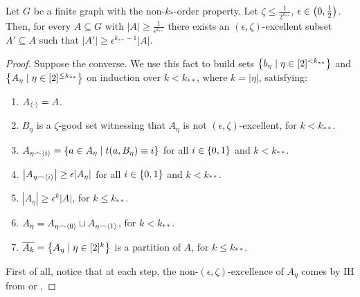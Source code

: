    \begin{lemma}[Claim 5.4] \label{lem:existance_of_excellent_subsets}
        Let $G$ be a finite graph with the non-$k_{*}$-order property.
        Let $\zeta \leq \frac{1}{2^{k_{**}}}$, $\epsilon \in \left( 0, \frac{1}{2} \right)$.
        Then, for every $A \subseteq G$ with $|A| \geq \frac{1}{\epsilon^{k_{**}}}$ there exists an $(\epsilon, \zeta)$-excellent
        subset $A' \subseteq A$ such that $|A'| \geq \epsilon^{k_{**}-1} |A|$.
        \begin{proof}
            Suppose the converse.
            We use this fact to build sets $\left\{ b_\eta \mid \eta \in [2]^{<k_{**}} \right\}$ and
            $\left\{ A_\eta \mid \eta \in [2]^{\leq k_{**}} \right\}$ on induction over $k<k_{**}$, where $k = |\eta|$,
            satisfying:
            \begin{enumerate}
                \item\label{itm:existance_of_excellent_subsets.1} $A_{\left< \cdot \right>} = A$.
                \item\label{itm:existance_of_excellent_subsets.2} $B_\eta$ is a $\zeta$-good set witnessing that $A_\eta$ is not
                    $(\epsilon, \zeta)$-excellent, for $k < k_{**}$.
                \item\label{itm:existance_of_excellent_subsets.3} $A_{\eta \frown \left< i \right>} = \left\{ a \in A_\eta \mid t(a, B_\eta) \equiv i \right\}$
                    for all $i \in \left\{ 0,1 \right\}$ and $k < k_{**}$.
                \item\label{itm:existance_of_excellent_subsets.4} $\left| A_{\eta \frown \left< i \right>} \right| \geq \epsilon |A_\eta|$
                    for all $i \in \left\{ 0,1 \right\}$ and $k < k_{**}$.
                \item\label{itm:existance_of_excellent_subsets.5} $|A_\eta| \geq \epsilon^k |A|$, for $k \leq k_{**}$.
                \item\label{itm:existance_of_excellent_subsets.6} $A_\eta = A_{\eta \frown \left< 0 \right>} \sqcup A_{\eta \frown \left< 1 \right>}$,
                    for $k < k_{**}$.
                \item\label{itm:existance_of_excellent_subsets.7} $\overline{A_k} = \left\{ A_\eta \mid \eta \in [2]^k \right\}$ is a partition of $A$,
                    for $k \leq k_{**}$.
            \end{enumerate}
            First of all, notice that at each step, the non-$(\epsilon, \zeta)$-excellence of $A_\eta$ comes by IH
            from  or ,

\end{proof}
\end{lemma}
